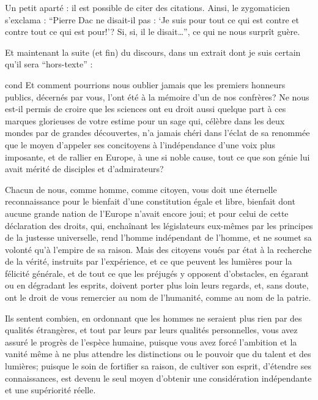 \documentclass[12pt,version=final,space=onehalf,localtocs,localbibs]{yathesis}
\begin{document}
Un petit aparté : il est possible de citer des
citations. Ainsi, le zygomaticien
s'exclama : \enquote{Pierre Dac ne disait-il pas : \enquote{Je suis
    pour tout ce qui est contre et contre tout ce qui est pour!}?
  Si, si, il le disait\ldots{}}, ce qui ne nous surprît guère.

Et maintenant la suite (et fin) du discours, dans un extrait dont je
suis certain qu'il sera \enquote{hors-texte} :
%
\begin{displaycquote}[509-511]{cond}
  Et comment pourrions nous oublier jamais que les premiers honneurs
  publics, décernés par vous, l'ont été à la mémoire d'un de nos
  confrères? Ne nous est-il permis de croire que les sciences ont eu
  droit aussi quelque part à ces marques glorieuses de votre estime
  pour un sage qui, célèbre dans les deux mondes par de grandes
  découvertes, n'a jamais chéri dans l'éclat de sa renommée que le
  moyen d'appeler ses concitoyens à l'indépendance d'une voix plus
  imposante, et de rallier en Europe, à une si noble cause, tout ce
  que son génie lui avait mérité de disciples et d'admirateurs?

  Chacun de nous, comme homme, comme citoyen, vous doit une éternelle
  reconnaissance pour le bienfait d'une constitution égale et libre,
  bienfait dont aucune grande nation de l'Europe n'avait encore joui;
  et pour celui de cette déclaration des droits, qui, enchaînant les
  législateurs eux-mêmes par les principes de la justesse universelle,
  rend l'homme indépendant de l'homme, et ne soumet sa volonté qu'à
  l'empire de sa raison.  Mais des citoyens voués par état à la
  recherche de la vérité, instruits par l'expérience, et ce que
  peuvent les lumières pour la félicité générale, et de tout ce que
  les préjugés y opposent d'obstacles, en égarant ou en dégradant les
  esprits, doivent porter plus loin leurs regards, et, sans doute, ont
  le droit de vous remercier au nom de l'humanité, comme au nom de la
  patrie.

  Ils sentent combien, en ordonnant que les hommes ne seraient plus
  rien par des qualités étrangères, et tout par leurs par leurs
  qualités personnelles, vous avez assuré le progrès de l'espèce
  humaine, puisque vous avez forcé l'ambition et la vanité même à ne
  plus attendre les distinctions ou le pouvoir que du talent et des
  lumières; puisque le soin de fortifier sa raison, de cultiver son
  esprit, d'étendre ses connaissances, est devenu le seul moyen
  d'obtenir une considération indépendante et une supériorité réelle.


\end{displaycquote}
\end{document}
